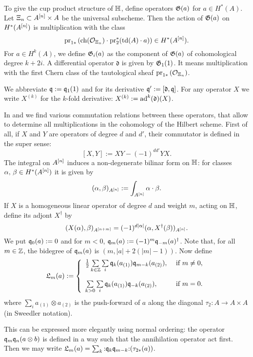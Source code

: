 \begin{definition}
To give the cup product structure of $\mathbb{H}$, define operators $\mathfrak{G}(a)$ for $a \in H^*(A)$. Let $\Xi_n \subset A^{[n]}\times A$ be the universal subscheme. Then the action of $\mathfrak{G}(a)$ on $H^*(A^{[n]})$ is multiplication with the class
$$
\operatorname{pr}_{1*}\left( \operatorname{ch}(\mathcal{O}_{\Xi_n})\cdot \operatorname{pr}_2^*(\operatorname{td}(A)\cdot a) \right) \in H^*(A^{[n]}).
$$
For $a \in H^k(A)$, we define $\mathfrak{G}_i(a)$ as the component of $\mathfrak{G}(a)$ of cohomological degree $k+2i$. A differential operator $\mathfrak{d}$ is given by $\mathfrak{G}_1(1)$. It means multiplication with the first Chern class of the tautological sheaf $\operatorname{pr}_{1*}\left( \mathcal{O}_{\Xi_n}\right)$.
\end{definition}
\begin{notation} 
We abbreviate $\mathfrak{q} := \mathfrak{q}_1(1)$ and for its derivative $\mathfrak{q}':= [\mathfrak d, \mathfrak{q}]$. For any operator $X$ we write $X^{(k)}$ for the $k$-fold derivative: $X^{(k)} :=\operatorname{ad}^k(\mathfrak{d}) (X)$.
\end{notation}
In \cite{LehnSorger} and \cite{LiQinWang} we find various commutation relations between these operators, that allow to determine all multiplications in the cohomology of the Hilbert scheme. First of all, if $X$ and $Y$ are operators of degree $d$ and $d'$, their commutator is defined in the super sense: 
$$
[X,Y] := XY - (-1)^{dd'}YX.
$$
The integral on $A^{[n]}$ induces a non-degenerate bilinar form on $\mathbb{H}$: for classes $\alpha,\,\beta\in H^*(A^{[n]})$ it is given by
$$
(\alpha,\beta)_{A^{[n]}} :=  \int_{A^{[n]}}\alpha\cdot\beta.
$$
If $X$ is a homogeneous linear operator of degree $d$ and weight $m$, acting on $\mathbb{H}$, define its adjont $X^\dagger$ by
$$
(X(\alpha),\beta)_{A^{[n+m]}}  = (-1)^{d|\alpha|}( \alpha , X^\dagger (\beta))_{A^{[n]}}.
$$
We put $\mathfrak{q}_0(a) :=0$ and for $m<0$, $\mathfrak{q}_m(a) := (-1)^m \mathfrak{q}_{-m}(a)^\dagger$. Note that, for all $m\in\mathbb{Z}$, the bidegree of $\mathfrak{q}_m(a)$ is $(m,|a| + 2(|m|-1))$. Now define
$$
\mathfrak{L}_m(a) := \left\{ 
\begin{array}{ll}
 \tfrac{1}{2}\sum\limits_{k\in\Z}\sum\limits_{i}\q_k( a_{(1)})\q_{m-k}( a_{(2)}), & \text{ if } m\neq 0, \vspace{4mm}\\
 \sum\limits_{k>0}\sum\limits_{i}\q_k( a_{(1)})\q_{-k}( a_{(2)}), & \text{ if } m= 0. \\
\end{array}
\right.
$$
where $\sum_i a_{(1)}\otimes  a_{(2)}$ is the push-forward of $a$ along the diagonal $\tau_2 :A \rightarrow A\times A$ (in Sweedler notation).
\begin{remark}
This can be expressed more elegantly using normal ordering: the operator $\mathfrak{q}_m\mathfrak{q}_n(a\otimes b)$ is defined in a way such that the annihilation operator act first. Then we may write $\mathfrak{L}_m(a) = \sum_k
\mathop{:}\nolimits\! \mathfrak{q}_k \mathfrak{q}_{m-k} \!\mathop{:}\nolimits (\tau_{2*}(a))$.
\end{remark}
